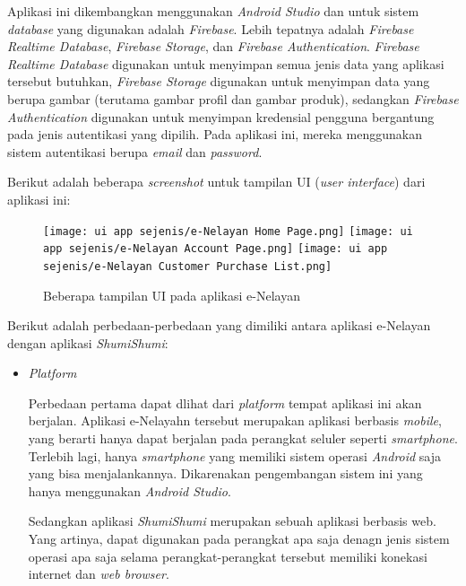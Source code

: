 \documentclass[a4paper]{article}
\begin{document}
\begin{itemize}
\begin{enumerate}
        Aplikasi ini dikembangkan menggunakan \textit{Android Studio} dan untuk sistem \textit{database} yang digunakan adalah \textit{Firebase}. Lebih tepatnya adalah \textit{Firebase Realtime Database}, \textit{Firebase Storage}, dan \textit{Firebase Authentication}. \textit{Firebase Realtime Database} digunakan untuk menyimpan semua jenis data yang aplikasi tersebut butuhkan, \textit{Firebase Storage} digunakan untuk menyimpan data yang berupa gambar (terutama gambar profil dan gambar produk), sedangkan \textit{Firebase Authentication} digunakan untuk menyimpan kredensial pengguna bergantung pada jenis autentikasi yang dipilih. Pada aplikasi ini, mereka menggunakan sistem autentikasi berupa \textit{email} dan \textit{password}\autocite[1-10]{fishes-marketplace}.
    
        Berikut adalah beberapa \textit{screenshot} untuk tampilan UI (\textit{user interface}) dari aplikasi ini:
        \begin{figure}[h]
            \texttt{[image: ui app sejenis/e-Nelayan Home Page.png]}\hfill
            \texttt{[image: ui app sejenis/e-Nelayan Account Page.png]}\hfill
            \texttt{[image: ui app sejenis/e-Nelayan Customer Purchase List.png]}
            \caption{Beberapa tampilan UI pada aplikasi e-Nelayan}
        \end{figure}
    
        Berikut adalah perbedaan-perbedaan yang dimiliki antara aplikasi e-Nelayan dengan aplikasi \textit{ShumiShumi}:
    
        \begin{itemize}
            \item \textit{Platform}
    
            Perbedaan pertama dapat dlihat dari \textit{platform} tempat aplikasi ini akan berjalan. Aplikasi e-Nelayahn tersebut merupakan aplikasi berbasis \textit{mobile}, yang berarti hanya dapat berjalan pada perangkat seluler seperti \textit{smartphone}. Terlebih lagi, hanya \textit{smartphone} yang memiliki sistem operasi \textit{Android} saja yang bisa menjalankannya. Dikarenakan pengembangan sistem ini yang hanya menggunakan \textit{Android Studio}\autocite[1-10]{fishes-marketplace}.
    
            Sedangkan aplikasi \textit{ShumiShumi} merupakan sebuah aplikasi berbasis web. Yang artinya, dapat digunakan pada perangkat apa saja denagn jenis sistem operasi apa saja selama perangkat-perangkat tersebut memiliki konekasi internet dan \textit{web browser}.
    

\end{itemize}
\end{enumerate}
\end{itemize}
\end{document}
